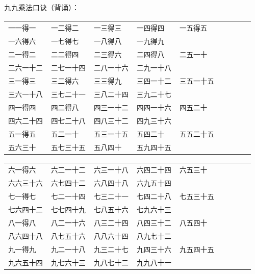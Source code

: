 \documentclass[12pt,UTF8]{ctexart}
\begin{document}
九九乘法口诀（背诵）：
\begin{center}
    \begin{tabular}{ p{5em} p{5em} p{5em} p{5em} p{5em} p{5em} p{5em} p{5em} p{5em}}
        \texttt{一一得一} & \texttt{一二得二} & \texttt{一三得三} & \texttt{一四得四} & \texttt{一五得五}\\
        \texttt{一六得六} & \texttt{一七得七} & \texttt{一八得八} & \texttt{一九得九} & \\
        \texttt{二一得二} & \texttt{二二得四} & \texttt{二三得六} & \texttt{二四得八} & \texttt{二五一十}\\
        \texttt{二六一十二} & \texttt{二七一十四} & \texttt{二八一十六} & \texttt{二九一十八} & \\
        \texttt{三一得三} & \texttt{三二得六} & \texttt{三三得九} & \texttt{三四一十二} & \texttt{三五一十五}\\
        \texttt{三六一十八} & \texttt{三七二十一} & \texttt{三八二十四} & \texttt{三九二十七} & \\
        \texttt{四一得四} & \texttt{四二得八} & \texttt{四三一十二} & \texttt{四四一十六} & \texttt{四五二十}\\
        \texttt{四六二十四} & \texttt{四七二十八} & \texttt{四八三十二} & \texttt{四九三十六} & \\
        \texttt{五一得五} & \texttt{五二一十} & \texttt{五三一十五} & \texttt{五四二十} & \texttt{五五二十五}\\
        \texttt{五六三十} & \texttt{五七三十五} & \texttt{五八四十} & \texttt{五九四十五} & \\
    \end{tabular}
\end{center}

\begin{center}
    \begin{tabular}{ p{5em} p{5em} p{5em} p{5em} p{5em} p{5em} p{5em} p{5em} p{5em}}
        \texttt{六一得六} & \texttt{六二一十二} & \texttt{六三一十八} & \texttt{六四二十四} & \texttt{六五三十}\\
        \texttt{六六三十六} & \texttt{六七四十二} & \texttt{六八四十八} & \texttt{六九五十四} & \\
        \texttt{七一得七} & \texttt{七二一十四} & \texttt{七三二十一} & \texttt{七四二十八} & \texttt{七五三十五}\\
        \texttt{七六四十二} & \texttt{七七四十九} & \texttt{七八五十六} & \texttt{七九六十三} & \\
        \texttt{八一得八} & \texttt{八二一十六} & \texttt{八三二十四} & \texttt{八四三十二} & \texttt{八五四十}\\
        \texttt{八六四十八} & \texttt{八七五十六} & \texttt{八八六十四} & \texttt{八九七十二} & \\
        \texttt{九一得九} & \texttt{九二一十八} & \texttt{九三二十七} & \texttt{九四三十六} & \texttt{九五四十五}\\
        \texttt{九六五十四} & \texttt{九七六十三} & \texttt{九八七十二} & \texttt{九九八十一} & \\
    \end{tabular}
\end{center}
\end{document}
